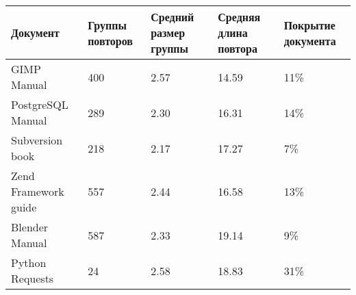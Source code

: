 \begin{minipage}{0.9\textwidth}
\begin{adjustbox}{center}
\begin{tabular}{|l||m{}|m{}|m{}|m{}|}
	\hline
	Документ & Группы повторов & Средний размер группы & Средняя длина повтора & Покрытие документа \\
	\hline
	\hline
	GIMP Manual & 400 & 2.57 & 14.59 & 11\% \\
	\hline
	PostgreSQL Manual & 289 & 2.30 & 16.31  & 14\% \\
	\hline
	Subversion book & 218 & 2.17 & 17.27 & 7\% \\
	\hline
	Zend Framework guide & 557 & 2.44 & 16.58 & 13\% \\
	\hline
	Blender Manual & 587 & 2.33 & 19.14 & 9\% \\
	\hline
	Python Requests & 24 & 2.58 & 18.83 & 31\% \\
	\hline
\end{tabular}
\end{adjustbox}
\end{minipage}